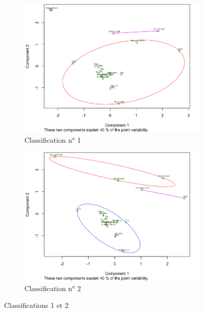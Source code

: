 \documentclass[a4paper,10pt]{report}
\begin{document}
\begin{figure}[H]
	\centering
	\captionsetup{justification=centering, margin=2cm}
	\begin{subfigure}[b]{0.5\linewidth}
		\centering
		\captionsetup{justification=centering}
		\includegraphics[width=1\linewidth]{img/3-3-mut-K-means-class-1}
		\caption{\small Classification n° 1}
		\label{fig:3-3-mut-K-means-class-1}
	\end{subfigure}%
	\begin{subfigure}[b]{0.5\linewidth}
		\centering
		\captionsetup{justification=centering}
		\includegraphics[width=1\linewidth]{img/3-3-mut-K-means-class-2}
		\caption{\small Classification n° 2}
		\label{fig:3-3-mut-K-means-class-2}
	\end{subfigure}%
	\caption{\small Classifications 1 et 2}
\end{figure}
\end{document}
